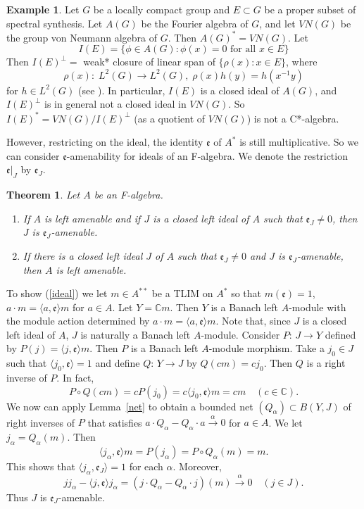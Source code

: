 \documentclass{tran-l}
\numberwithin{equation}{section}
\newtheorem{thm}{Theorem}[section]
\theoremstyle{definition}
\newtheorem*{example}{Example}
\theoremstyle{remark}
\begin{document}
\begin{example}
Let $G$ be a locally compact group and $E \subset G$ be a proper subset of spectral synthesis. Let $A(G)$ be the Fourier algebra of $G$, and let $VN(G)$ be the group von Neumann algebra of $G$. Then $A(G)^* = VN(G)$. Let 
\[ I(E) = \{\phi\in A(G): \phi(x)=0 \text{ for all }x\in E\} \]
Then $I(E)^\perp =$ weak* closure of linear span of $\{\rho(x): x\in E\}$, where 
\[
\rho(x):\; L^2(G) \to L^2(G),\; \rho(x)h(y) = h(x^{-1}y)
\]
 for $h \in L^2(G)$ (see \cite[Lemma 7.3]{Lau-Losert}). In particular, $I(E)$ is a closed ideal of $A(G)$, and $I(E)^\perp$ is in general not a closed ideal in $VN(G)$. So $I(E)^* = VN(G)/I(E)^\perp$ (as a quotient of $VN(G)$) is not a C*-algebra. 
\end{example}

 However, restricting on the ideal, the identity ${\mathfrak{e}}$ of $A^*$ is still  multiplicative. So we can consider ${\mathfrak{e}}$-amenability for ideals of an F-algebra. We denote the restriction ${\mathfrak{e}}|_J$ by ${\mathfrak{e}}_J$.

\begin{thm}\label{left ideal}
Let $ A$ be an F-algebra.
\begin{enumerate}
\item If $A$ is left amenable and if $J$ is a closed left ideal of $ A$ such that ${\mathfrak{e}}_J \neq 0$, then $J$ is ${\mathfrak{e}}_J$-amenable.\label{ideal}
\item If there is a closed left ideal $J$ of $ A$ such that ${\mathfrak{e}}_J \neq 0$ and $J$ is ${\mathfrak{e}}_J$-amenable, then $ A$ is left amenable.\label{ideal converse}
\end{enumerate}
\end{thm}

\proof
To show (\ref{ideal}) we let $m\in  A^{**}$ be a TLIM on $ A^*$ so that  $m({\mathfrak{e}})= 1$, $a\cdot m = {\langle} a,{\mathfrak{e}}{\rangle}  m$ for $a\in  A$. Let $Y =  {\mathbb{C}} m$. Then $Y$ is a Banach left $ A$-module with the module action determined by $a\cdot m = {\langle} a,{\mathfrak{e}}{\rangle}  m$. Note that, since $J$ is a closed left ideal of $ A$, $J$ is naturally a Banach left $ A$-module. Consider $P$: $J\to Y$ defined by $P(j) = {\langle} j,{\mathfrak{e}}{\rangle} m$. Then $P$ is a Banach left $ A$-module morphism. Take a $j_0\in J$ such that ${\langle} j_0,{\mathfrak{e}}{\rangle} = 1$ and define $Q$: $Y\to J$ by $Q(cm) = cj_0$. Then $Q$ is a right inverse of $P$. In fact, 
\[
P\circ Q(cm) = cP(j_0) = c{\langle} j_0,{\mathfrak{e}}{\rangle} m = cm\quad (c\in  {\mathbb{C}}).
\]
 We now can apply Lemma~\ref{net} to obtain a bounded net $(Q_{\alpha})\subset B(Y,J)$ of right inverses of $P$ that satisfies $a\cdot Q_{\alpha} - Q_{\alpha}\cdot a \overset{\alpha}{\to} 0$ for $a\in  A$. We let $j_{\alpha} = Q_{\alpha}(m)$. Then 
 \[
 {\langle} j_{\alpha}, {\mathfrak{e}} {\rangle} m = P(j_{\alpha}) = P\circ Q_{\alpha}(m) = m.
 \]
  This shows that ${\langle} j_{\alpha}, {\mathfrak{e}}_J {\rangle} =1$ for each ${\alpha}$. Moreover, 
  \[
  jj_{\alpha} - {\langle} j, {\mathfrak{e}} {\rangle} j_{\alpha} = (j\cdot Q_{\alpha} - Q_{\alpha}\cdot j )(m) \overset{\alpha}{\to} 0\quad (j\in J).\]
   Thus $J$ is ${\mathfrak{e}}_J$-amenable.
\end{document}
